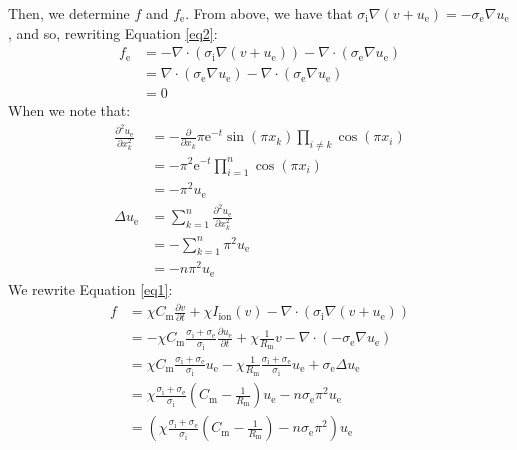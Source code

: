 \documentclass{article}
\newcommand{\ee}{\mathrm{e}}
\begin{document}
Then, we determine $f$ and $f_\text{e}$.
From above, we have that $\sigma_\text{i} \nabla (v + u_\text{e}) = - \sigma_\text{e} \nabla u_\text{e}$,
and so, rewriting Equation \ref{eq2}:
\begin{align*}
    f_\text{e} & = -\nabla \cdot (\sigma_\text{i} \nabla (v + u_\text{e})) - \nabla \cdot (\sigma_\text{e} \nabla u_\text{e}) \\
        & = \nabla \cdot (\sigma_\text{e} \nabla u_\text{e}) - \nabla \cdot (\sigma_\text{e} \nabla u_\text{e}) \\
        & = 0
\end{align*}
\noindent When we note that:
\begin{align*}
    \frac{\partial^2 u_\text{e}}{\partial x_k^2}
        & = -\frac{\partial}{\partial x_k} \pi \ee^{-t} \sin(\pi x_k) \prod_{i \neq k} \cos(\pi x_i) \\
        & = -\pi^2 \ee^{-t} \prod_{i = 1}^n \cos(\pi x_i) \\
        & = -\pi^2 u_\text{e} \\
    \Delta u_\text{e}
        & = \sum_{k = 1}^n \frac{\partial^2 u_\text{e}}{\partial x_k^2} \\
        & = -\sum_{k = 1}^n \pi^2 u_\text{e} \\
        & = -n \pi^2 u_\text{e}
\end{align*}
\noindent We rewrite Equation \ref{eq1}:
\begin{align*}
    f & = \chi C_\text{m} \frac{\partial v}{\partial t}
            + \chi I_\text{ion}(v)
            - \nabla \cdot (\sigma_\text{i} \nabla (v + u_\text{e})) \\
        & = -\chi C_\text{m} \frac{\sigma_\text{i} + \sigma_\text{e}}{\sigma_\text{i}} \frac{\partial u_\text{e}}{\partial t}
            + \chi \frac{1}{R_\text{m}} v
            - \nabla \cdot (-\sigma_\text{e} \nabla u_\text{e}) \\
        & = \chi C_\text{m} \frac{\sigma_\text{i} + \sigma_\text{e}}{\sigma_\text{i}} u_\text{e}
            -\chi \frac{1}{R_\text{m}} \frac{\sigma_\text{i} + \sigma_\text{e}}{\sigma_\text{i}} u_\text{e}
            + \sigma_\text{e} \Delta u_\text{e} \\
        & = \chi \frac{\sigma_\text{i} + \sigma_\text{e}}{\sigma_\text{i}} (C_\text{m} - \frac{1}{R_\text{m}}) u_\text{e}
            - n \sigma_\text{e} \pi^2 u_\text{e} \\
        & = (\chi \frac{\sigma_\text{i} + \sigma_\text{e}}{\sigma_\text{i}} (C_\text{m} - \frac{1}{R_\text{m}})
            - n \sigma_\text{e} \pi^2) u_\text{e}
\end{align*}
\end{document}
